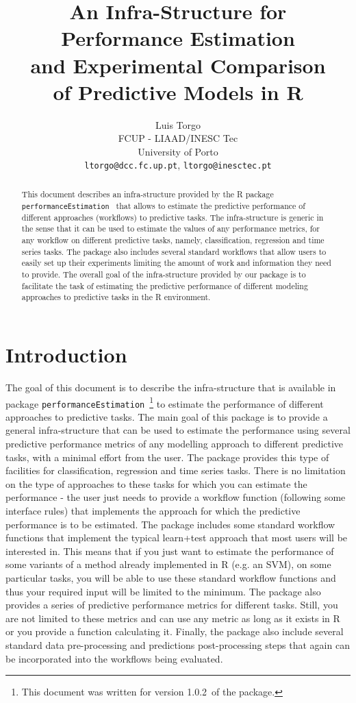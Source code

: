 \documentclass[10pt,a4paper]{article}\usepackage[]{graphicx}\usepackage[]{color}
\author{Luis Torgo\\FCUP - LIAAD/INESC Tec\\University of Porto\\
  \texttt{ltorgo@dcc.fc.up.pt}, \texttt{ltorgo@inesctec.pt}}
\title{An Infra-Structure for Performance Estimation\\ and Experimental Comparison\\ of Predictive Models in R}
\newcommand{\PE}{package \texttt{performanceEstimation}\ }
\newcommand{\PEversion}{1.0.2\ }
\begin{document}
\maketitle

\begin{abstract}
  
  This document describes an infra-structure provided by the R \PE
  that allows to estimate the predictive performance of different
  approaches (workflows) to predictive tasks.  The infra-structure is
  generic in the sense that it can be used to estimate the values of
  any performance metrics, for any workflow on different predictive
  tasks, namely, classification, regression and time series tasks. The
  package also includes several standard workflows that allow users to
  easily set up their experiments limiting the amount of work and
  information they need to provide. The overall goal of the
  infra-structure provided by our package is to facilitate the task of
  estimating the predictive performance of different modeling
  approaches to predictive tasks in the R environment.
   
\end{abstract}

\section{Introduction}

The goal of this document is to describe the infra-structure that is
available in \PE\footnote{This document was written for version \PEversion of the package.} to estimate the performance of different approaches
to predictive tasks.  The main goal of this package is to provide a
general infra-structure that can be used to estimate the performance
using several predictive performance metrics of any modelling approach
to different predictive tasks, with a minimal effort from the
user. The package provides this type of facilities for classification,
regression and time series tasks. There is no limitation on the type
of approaches to these tasks for which you can estimate the
performance - the user just needs to provide a workflow function
(following some interface rules) that implements the approach for
which the predictive performance is to be estimated. The package
includes some standard workflow functions that implement the typical
learn+test approach that most users will be interested
in. This means that if you just want to estimate the performance of
some variants of a method already implemented in R (e.g. an SVM), on
some particular tasks, you will be able to use these standard workflow
functions and thus your required input will be limited to the minimum. The
package also provides a series of predictive performance metrics for
different tasks. Still, you are not limited to these metrics and can
use any metric as long as it exists in R or you provide a function
calculating it. Finally, the package also
include several standard data pre-processing and predictions
post-processing steps that again can be incorporated into the
workflows being evaluated.  
\end{document}
